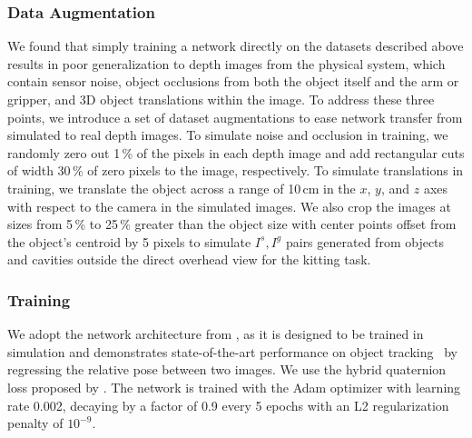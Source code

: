 \subsubsection{Data Augmentation}
We found that simply training a network directly on the datasets described above results in poor generalization to depth images from the physical system, which contain sensor noise, object occlusions from both the object itself and the arm or gripper, and 3D object translations within the image. To address these three points, we introduce a set of dataset augmentations to ease network transfer from simulated to real depth images. 
To simulate noise and occlusion in training, we randomly zero out 1\,\% of the pixels in each depth image and add rectangular cuts of width 30\,\% of zero pixels to the image, respectively.
To simulate translations in training,
we translate the object across a range of 10\,cm in the $x$, $y$, and $z$ axes with respect to the camera in the simulated images. We also crop the images at sizes from 5\,\% to 25\,\% greater than the object size with center points offset from the object's centroid by 5 pixels to simulate
$I^s, I^g$ pairs generated from objects and cavities outside the direct overhead view for the kitting task. 


\subsubsection{Training} We adopt the network architecture from \citet{Wen2020se3TrackNetD6}, as it is designed to be trained in simulation and demonstrates state-of-the-art performance on object tracking~\cite{DengPoseRBPF} by regressing the relative pose between two images. We use the hybrid quaternion loss proposed by \citet{CASE_Orienting}. The network is trained with the Adam optimizer with learning rate 0.002, decaying by a factor of 0.9 every 5 epochs with an L2 regularization penalty of $10^{-9}$.

